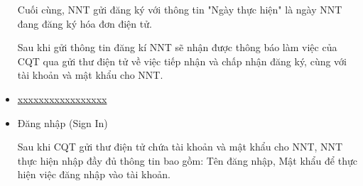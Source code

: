 \begin{itemize}




Cuối cùng, NNT gửi đăng ký với thông tin "Ngày thực hiện" là ngày NNT đang đăng ký hóa đơn điện tử.

Sau khi gửi thông tin đăng kí NNT sẽ nhận được thông báo làm việc của CQT qua gửi thư điện tử về việc tiếp nhận và chấp nhận đăng ký, cùng với tài khoản và mật khẩu cho NNT.









\item \underline{xxxxxxxxxxxxxxxxx}

\item Đăng nhập (Sign In)

Sau khi CQT gửi thư điện tử chứa tài khoản và mật khẩu cho NNT, NNT thực hiện nhập đầy đủ thông tin bao gồm: Tên đăng nhập, Mật khẩu để thực hiện việc đăng nhập vào tài khoản.


\end{itemize}
